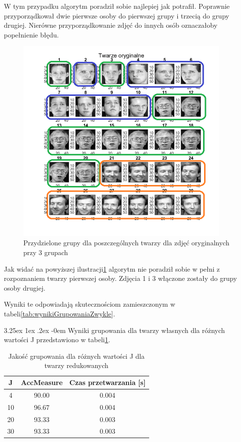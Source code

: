 \documentclass[11pt, a4paper]{article}
\makeatletter
\newcommand{\fbi}{\leavevmode{\parindent=1em\indent}}
\renewcommand\paragraph{\@startsection{paragraph}{5}{\z@}
  {3.25ex \@plus1ex \@minus.2ex}
  {-0em}
  {\normalfont\normalsize\bfseries}}
\makeatother
\begin{document}
\fbi
W tym przypadku algorytm poradził sobie najlepiej jak potrafił. Poprawnie przyporządkował dwie pierwsze osoby do pierwszej grupy i trzecią do grupy drugiej. Nierówne przyporządkowanie zdjęć do innych osób oznaczałoby popełnienie błędu.

\begin{figure}[H]
	\centering
	\includegraphics[width=0.95\textwidth]{./assets/ilustracja_zad2_dane_pogrupowane_3.png}
	\caption{Przydzielone grupy dla poszczególnych twarzy dla zdjęć oryginalnych przy 3 grupach}
	\label{fig:ilustracja_zad2_dane_pogrupowane_3}
\end{figure}

\fbi
Jak widać na powyższej ilustracji\ref{fig:ilustracja_zad2_dane_pogrupowane_3} algorytm nie poradził sobie w pełni z rozpoznaniem twarzy pierwszej osoby. Zdjęcia 1 i 3 włączone zostały do grupy osoby drugiej.

\fbi
Wyniki te odpowiadają skutecznościom zamieszczonym w tabeli\ref{tab:wynikiGrupowaniaZwykle}.

\paragraph{}
\fbi
Wyniki grupowania dla twarzy własnych dla różnych wartości J przedstawiono w tabeli\ref{tab:wynikiGrupowaniaWlasne}.

\begin{table}[H]
	\centering
	\caption{Jakość grupowania dla różnych wartości J dla twarzy redukowanych}
	\begin{tabular}{|c|c|c|}
		\hline 
		J & AccMeasure & Czas przetwarzania [s] \\ 
		\hline
		4 & 90.00 & 0.004 \\
		\hline
		10 & 96.67 & 0.004 \\
		\hline
		20 & 93.33 & 0.003 \\
		\hline
		30 & 93.33 & 0.003 \\
		\hline
	\end{tabular}
	\label{tab:wynikiGrupowaniaWlasne}
\end{table}
\end{document}
